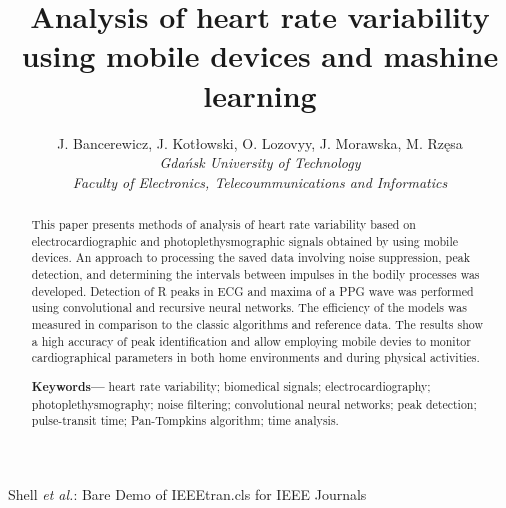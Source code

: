 \documentclass[journal]{IEEEtran}
\begin{document}
\title{Analysis of heart rate variability using mobile devices and mashine learning}
\author{
    J. Bancerewicz, J. Kotłowski, O. Lozovyy, J. Morawska, M. Rzęsa\\
    \textit{Gdańsk University of Technology}\\
    \textit{Faculty of Electronics, Telecoummunications and Informatics}
}


\markboth{}%
{Shell \MakeLowercase{\textit{et al.}}: Bare Demo of IEEEtran.cls for IEEE Journals}
\maketitle

\begin{abstract}
This paper presents methods of analysis of heart rate variability based on electrocardiographic and photoplethysmographic signals obtained by using mobile devices. An approach to processing the saved data involving noise suppression, peak detection, and determining the intervals between impulses in the bodily processes was developed. Detection of R peaks in ECG and maxima of a PPG wave was performed using convolutional and recursive neural networks. The efficiency of the models was measured in comparison to the classic algorithms and reference data. The results show a high accuracy of peak identification and allow employing mobile devies to monitor cardiographical parameters in both home environments and during physical activities.


\textbf{Keywords---} heart rate variability; biomedical signals; electrocardiography; photoplethysmography; noise filtering; convolutional neural networks; peak detection; pulse-transit time; Pan-Tompkins algorithm; time analysis.
\end{abstract}
\end{document}
